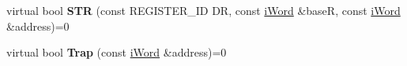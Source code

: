 \begin{DoxyCompactItemize}
\item 
\hypertarget{classiSimulator_aec50c2cc4b7fc2429bfa62ddc79d41df}{
virtual bool {\bfseries STR} (const REGISTER\_\-ID DR, const \hyperlink{classiWord}{iWord} \&baseR, const \hyperlink{classiWord}{iWord} \&address)=0}
\label{classiSimulator_aec50c2cc4b7fc2429bfa62ddc79d41df}

\item 
\hypertarget{classiSimulator_a9ddfcfe7f0c1d563193b096e1058e388}{
virtual bool {\bfseries Trap} (const \hyperlink{classiWord}{iWord} \&address)=0}
\label{classiSimulator_a9ddfcfe7f0c1d563193b096e1058e388}

\end{DoxyCompactItemize}
